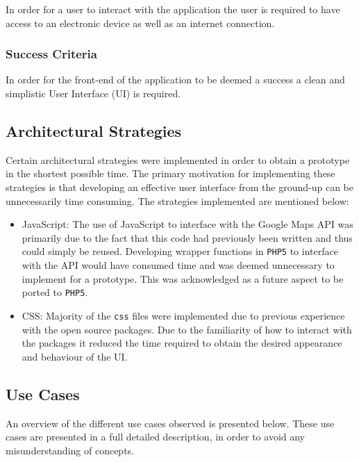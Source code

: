 \documentclass[10pt,twocolumn]{witseiepaper}
\begin{document}
			In order for a user to interact with the application the user is required to have access to an electronic device as well as an internet connection. 
			
		\subsubsection{Success Criteria}
		
			In order for the front-end of the application to be deemed a success a clean and simplistic User Interface (UI) is required. 
			
	\subsection{Architectural Strategies}
	
		Certain architectural strategies were implemented in order to obtain a prototype in the shortest possible time. The primary motivation for implementing these strategies is that developing an effective user interface from the ground-up can be unnecessarily time consuming. The strategies implemented are mentioned below:
		
		\begin{itemize}
			\item JavaScript: The use of JavaScript to interface with the Google Maps API was primarily due to the fact that this code had previously been written and thus could simply be reused. Developing wrapper functions in \texttt{PHP5} to interface with the API would have consumed time and was deemed unnecessary to implement for a prototype. This was acknowledged as a future aspect to be ported to \texttt{PHP5}.
			\item CSS: Majority of the \texttt{css} files were implemented due to previous experience with the open source packages. Due to the familiarity of how to interact with the packages it reduced the time required to obtain the desired appearance and behaviour of the UI.
		\end{itemize}
		
	\subsection{Use Cases}
	
		An overview of the different use cases observed is presented below. These use cases are presented in a full detailed description, in order to avoid any misunderstanding of concepts.
	
\end{document}
